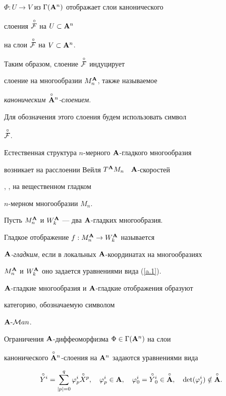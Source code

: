 $\Phi:U\to V$ из $\Gamma({\bold A}^n)$ отображает слои канонического


слоения $\overset{\,\circ}{\cal F}{}$ на  $U\subset{\bold A}^n$


на слои  $\overset{\,\circ}{\cal F}{}$ на  $V\subset{\bold A}^n$.


Таким образом, слоение $\overset{\,\circ}{\cal F}{}$ индуцирует


слоение на многообразии $M^{\bold A}_n$, также называемое


{\it каноническим $\overset{\circ}{\bold A}{}^n$-слоением}.


Для обозначения этого слоения будем использовать символ


$\overset{\,\circ}{\cal F}{}$.


Естественная структура $n$-мерного  ${\bold A}$-гладкого многообразия


возникает на расслоении Вейля  $T^{\bold A} M_n$ \  ${\bold A}$-скоростей


\cite{KMS}, \cite{VSh3}, \cite{VSh4} на вещественном гладком


$n$-мерном многообразии $M_n$.





Пусть  $M^{\bold A}_n$ и $W^{\bold A}_k$ --- два ${\bold A}$-гладких многообразия.


Гладкое отображение $f:M^{\bold A}_n\to W^{\bold A}_k$ называется


{\it ${\bold A}$-гладким}, если в локальных ${\bold A}$-координатах на многообразиях


$M^{\bold A}_n$ и $W^{\bold A}_k$ оно задается уравнениями вида (\ref{a.1}).


${\bold A}$-гладкие  многообразия и ${\bold A}$-гладкие отображения образуют


категорию, обозначаемую символом


${\bold A}\text{-}{\cal M}an$.





Ограничения ${\bold A}$-диффеоморфизма  $\Phi\in\Gamma({\bold A}^n)$ на слои 


канонического $\overset{\circ}{\bold A}{}^n$-слоения на ${\bold A}^n$ задаются уравнениями вида


\begin{equation}


{\puto Y}{}^i=


\sum^q_{|p|=0}\varphi^i_p{\puto X}{}^p,


\quad \varphi^i_p\in\A,\quad


\varphi^i_0={\puto Y}{}^i_0\in\Ao,


\quad \det(\varphi^i_j)\notin\Ao.


\label{k.2}


\end{equation}


